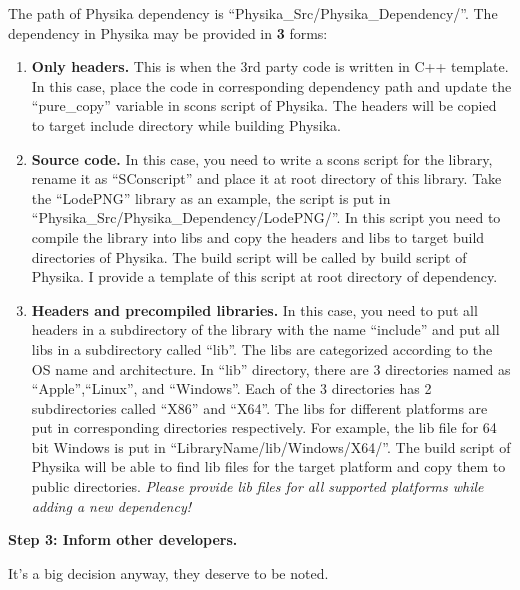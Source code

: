 \documentclass[11pt,fullpage]{article}
\newcommand{\subheading}[1]{\noindent \textbf{#1}}
\begin{document}
\noindent{}The path of Physika dependency is
``Physika\_{}Src/Physika\_{}Dependency/''. The dependency in Physika may be provided in \textbf{3}
forms:
\begin{enumerate}
\item{\textbf{Only headers.} This is when the 3rd party code is
    written in C++ template. In this case, place the code in
    corresponding dependency path and update the ``pure\_{}copy''
    variable in scons script of Physika. The headers will be copied to
  target include directory while building Physika.}
\item{\textbf{Source code.} In this case, you need to write a scons
    script for the library, rename it as ``SConscript'' and place it
    at root directory of this library. Take the ``LodePNG'' library as
    an example, the script is put in
    ``Physika\_{}Src/Physika\_{}Dependency/LodePNG/''. In this script you need to
    compile the library into libs and copy the headers and libs to
    target build directories of Physika. The build script will be called
  by build script of Physika. I provide a template of this script at
  root directory of dependency.}
\item{\textbf{Headers and precompiled libraries.} In this case, you
    need to put all headers in a subdirectory of the library with the
    name ``include'' and put all libs in a subdirectory called
    ``lib''. The libs are categorized according to the OS name and
    architecture. In ``lib'' directory, there are 3 directories named
    as ``Apple'',``Linux'', and ``Windows''. Each of the 3 directories
  has 2 subdirectories called ``X86'' and ``X64''. The libs for
  different platforms are put in corresponding directories
  respectively. For example, the lib file for 64 bit Windows is put in
``LibraryName/lib/Windows/X64/''. The build script of Physika will be
able to find lib files for the target platform and copy them to public
directories. \emph{Please provide lib files for all supported platforms
while adding a new dependency!}}
\end{enumerate}

\subheading{Step 3: Inform other developers.}

\noindent{}It's a big decision anyway, they deserve to be noted.
\end{document}
